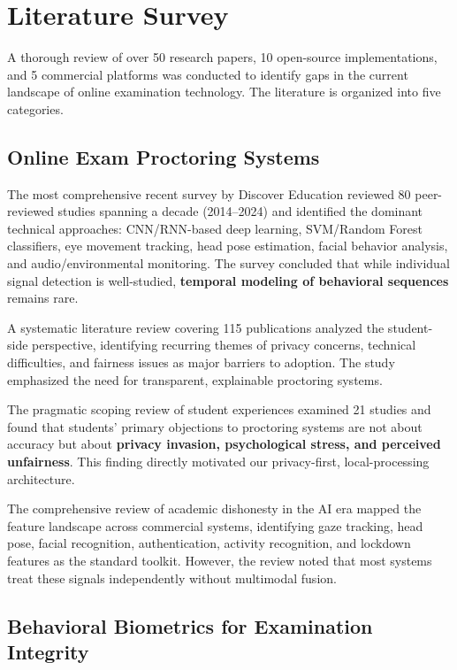 \documentclass{article}
\begin{document}
\section{Literature Survey}
\label{sec:literature}

A thorough review of over 50 research papers, 10 open-source implementations, and 5 commercial platforms was conducted to identify gaps in the current landscape of online examination technology. The literature is organized into five categories.

\subsection{Online Exam Proctoring Systems}

The most comprehensive recent survey by Discover Education \cite{systematic_review_2026} reviewed 80 peer-reviewed studies spanning a decade (2014--2024) and identified the dominant technical approaches: CNN/RNN-based deep learning, SVM/Random Forest classifiers, eye movement tracking, head pose estimation, facial behavior analysis, and audio/environmental monitoring. The survey concluded that while individual signal detection is well-studied, \textbf{temporal modeling of behavioral sequences} remains rare.

A systematic literature review covering 115 publications \cite{digital_proctoring_2024} analyzed the student-side perspective, identifying recurring themes of privacy concerns, technical difficulties, and fairness issues as major barriers to adoption. The study emphasized the need for transparent, explainable proctoring systems.

The pragmatic scoping review of student experiences \cite{student_experience_2024} examined 21 studies and found that students' primary objections to proctoring systems are not about accuracy but about \textbf{privacy invasion, psychological stress, and perceived unfairness}. This finding directly motivated our privacy-first, local-processing architecture.

The comprehensive review of academic dishonesty in the AI era \cite{academic_dishonesty_ai_2024} mapped the feature landscape across commercial systems, identifying gaze tracking, head pose, facial recognition, authentication, activity recognition, and lockdown features as the standard toolkit. However, the review noted that most systems treat these signals independently without multimodal fusion.

\subsection{Behavioral Biometrics for Examination Integrity}
\end{document}
